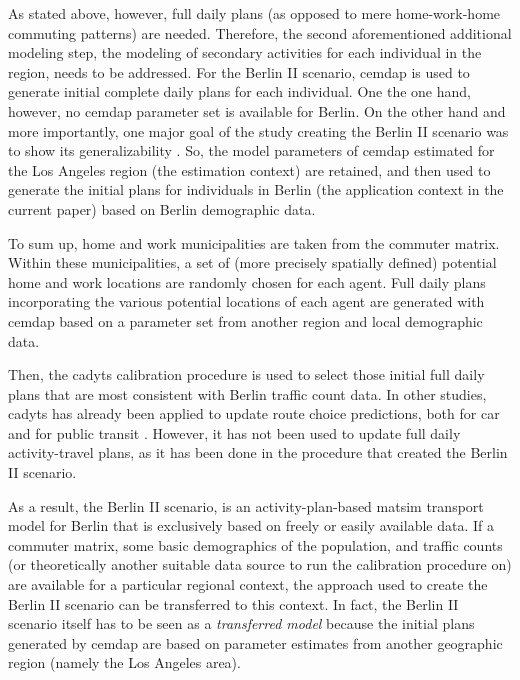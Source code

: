 As stated above, however, full daily plans (as opposed to mere home-work-home commuting patterns) are needed. Therefore, the second aforementioned additional modeling step, the modeling of secondary activities for each individual in the region, needs to be addressed. For the Berlin II scenario, \gls{cemdap} is used to generate initial complete daily plans for each individual. One the one hand, however, no \gls{cemdap} parameter set is available for Berlin. On the other hand and more importantly, one major goal of the study creating the Berlin II scenario was to show its generalizability \citep{ZiemkeNagelBhat2015IntegratingCemdapMatsimTransferabilityTRB}. So, the model parameters of \gls{cemdap} estimated for the Los Angeles region (the estimation context) are retained, and then used to generate the initial plans for individuals in Berlin (the application context in the current paper) based on Berlin demographic data.

To sum up, home and work municipalities are taken from the commuter matrix. Within these municipalities, a set of (more precisely spatially defined) potential home and work locations are randomly chosen for each agent. Full daily plans incorporating the various potential locations of each agent are generated with \gls{cemdap} based on a parameter set from another region and local demographic data.

Then, the \gls{cadyts} calibration procedure is used to select those initial full daily plans that are most consistent with Berlin traffic count data. In other studies, \gls{cadyts} has already been applied to update route choice predictions, both for car \citep{FloetteroedChenEtAl2011BehavioralCalibAndAna} and for public transit \citep{MoyoNagel2013ptNetCalibrationABMTPO}. However, it has not been used to update full daily activity-travel plans, as it has been done in the procedure that created the Berlin II scenario. 

As a result, the Berlin II scenario, is an activity-plan-based \gls{matsim} transport model for Berlin that is exclusively based on freely or easily available data. If a commuter matrix, some basic demographics of the population, and traffic counts (or theoretically another suitable data source to run the calibration procedure on) are available for a particular regional context, the approach used to create the Berlin II scenario can be transferred to this context. In fact, the Berlin II scenario itself has to be seen as a \emph{transferred model} because the initial plans generated by \gls{cemdap} are based on parameter estimates from another geographic region (namely the Los Angeles area).

